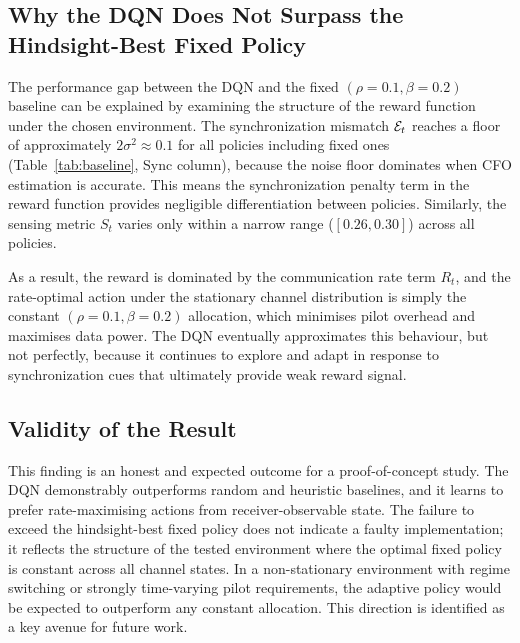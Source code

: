 \subsection{Why the DQN Does Not Surpass the Hindsight-Best Fixed Policy}

The performance gap between the DQN and the fixed $(\rho{=}0.1, \beta{=}0.2)$ baseline can be explained by examining the structure of the reward function under the chosen environment. The synchronization mismatch $\mathcal{E}_t$ reaches a floor of approximately $2\sigma^2 \approx 0.1$ for all policies including fixed ones (Table~\ref{tab:baseline}, Sync column), because the noise floor dominates when CFO estimation is accurate. This means the synchronization penalty term in the reward function provides negligible differentiation between policies. Similarly, the sensing metric $S_t$ varies only within a narrow range ($[0.26, 0.30]$) across all policies.

As a result, the reward is dominated by the communication rate term $R_t$, and the rate-optimal action under the stationary channel distribution is simply the constant $(\rho{=}0.1, \beta{=}0.2)$ allocation, which minimises pilot overhead and maximises data power. The DQN eventually approximates this behaviour, but not perfectly, because it continues to explore and adapt in response to synchronization cues that ultimately provide weak reward signal.

\subsection{Validity of the Result}

This finding is an honest and expected outcome for a proof-of-concept study. The DQN demonstrably outperforms random and heuristic baselines, and it learns to prefer rate-maximising actions from receiver-observable state. The failure to exceed the hindsight-best fixed policy does not indicate a faulty implementation; it reflects the structure of the tested environment where the optimal fixed policy is constant across all channel states. In a non-stationary environment with regime switching or strongly time-varying pilot requirements, the adaptive policy would be expected to outperform any constant allocation. This direction is identified as a key avenue for future work.

